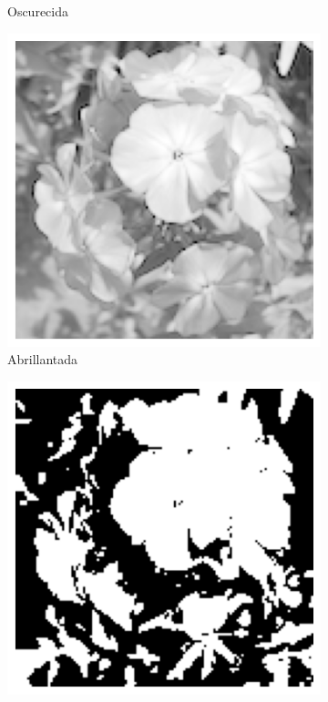 \documentclass{article}
\begin{document}
\begin{figure}
\begin{subfigure}[b]{0.24\textwidth}
		\caption{Oscurecida}
		\label{fg:imgGrau3p5exp}
	\end{subfigure}
	\begin{subfigure}[b]{0.24\textwidth}
		\includegraphics[width= \textwidth]{imgGrau0p4exp}
		\caption{Abrillantada}
		\label{fg:imgGrau0p4exp}
	\end{subfigure}
	\begin{subfigure}[b]{0.24\textwidth}
		\includegraphics[width= \textwidth]{imgGrau0binarizada}

\end{subfigure}
\end{figure}
\end{document}
